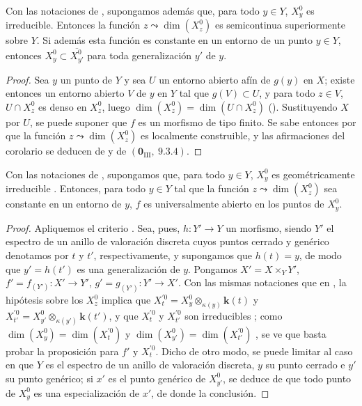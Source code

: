 \begin{corollary}[15.6.2]
\label{IV.15.6.2}
Con las notaciones de , supongamos además que, para todo $y\in Y$, $X_y^0$ es irreducible.
Entonces la función $z\leadsto\dim(X_z^0)$ es semicontinua superiormente sobre $Y$.
Si además esta función es constante en un entorno de un punto $y\in Y$, entonces $X_y^0\subset\overline{X_{y'}^0}$ para toda generalización $y'$ de $y$.
\end{corollary}

\begin{proof}
Sea $y$ un punto de $Y$ y sea $U$ un entorno abierto afín de $g(y)$ en $X$; existe entonces un entorno abierto $V$ de $y$ en $Y$ tal que $g(V)\subset U$, y para todo $z\in V$, $U\cap X_z^0$ es denso en $X_z^0$, luego $\dim(X_z^0)=\dim(U\cap X_z^0)$ ().
Sustituyendo $X$ por $U$, se puede suponer que $f$ es un morfismo de tipo finito.
Se sabe entonces por  que la función $z\leadsto\dim(X_z^0)$ es localmente construible, y las afirmaciones del corolario se deducen de  y de $(\mathbf{0}_{\mathrm{III}},~9.3.4)$.
\end{proof}

\begin{proposition}[15.6.3]
\label{IV.15.6.3}
Con las notaciones de , supongamos que, para todo $y\in Y$, $X_y^0$ es geométricamente irreducible .
Entonces, para todo $y\in Y$ tal que la función $z\leadsto\dim(X_z^0)$ sea constante en un entorno de $y$, $f$ es universalmente abierto en los puntos de $X_y^0$.
\end{proposition}

\begin{proof}
Apliquemos el criterio .
Sea, pues, $h:Y'\to Y$ un morfismo, siendo $Y'$ el espectro de un anillo de valoración discreta cuyos puntos cerrado y genérico denotamos por $t$ y $t'$, respectivamente, y supongamos que $h(t)=y$, de modo que $y'=h(t')$ es una generalización de $y$.
Pongamos $X'=X\times_Y Y'$, $f'=f_{(Y')}:X'\to Y'$, $g'=g_{(Y')}:Y'\to X'$.
Con las mismas notaciones que en , la hipótesis sobre los $X_z^0$ implica que $X_t^{\prime 0}=X_y^0\otimes_{\kappa(y)}\boldsymbol{k}(t)$ y $X_{t'}^{\prime 0}=X_{y'}^0\otimes_{\kappa(y')}\boldsymbol{k}(t')$, y que $X_t^{\prime 0}$ y $X_{t'}^{\prime 0}$ son irreducibles ; como $\dim(X_y^0)=\dim(X_t^{\prime 0})$ y $\dim(X_{y'}^0)=\dim(X_{t'}^{\prime 0})$ , se ve que basta probar la proposición para $f'$ y $X_t^{\prime 0}$. Dicho de otro modo, se puede limitar al caso en que $Y$ es el espectro de un anillo de valoración discreta, $y$ su punto cerrado e $y'$ su punto genérico; si $x'$ es el punto genérico de $X_{y'}^0$, se deduce de  que todo punto de $X_y^0$ es una especialización de $x'$, de donde la conclusión.
\end{proof}

